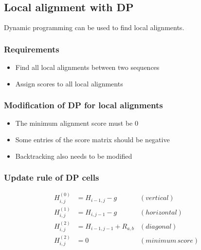 %
%

%
%
\subsection{Local alignment with DP}
Dynamic programming can be used to find local alignments.

%
%
\subsubsection*{Requirements}
\begin{itemize}
\item Find all local alignments between two sequences
\item Assign scores to all local alignments
\end{itemize}

%
%
\subsubsection*{Modification of DP for local alignments}
\begin{itemize}
\item The minimum alignment score must be 0
\item Some entries of the score matrix should be negative
\item Backtracking also needs to be modified
\end{itemize}

%
%
\subsubsection*{Update rule of DP cells}
\begin{align*}
H_{i,j}^{(0)} &= H_{i-1,j} - g &(vertical) \\
H_{i,j}^{(1)} &= H_{i,j-1} - g	&(horizontal) \\
H_{i,j}^{(2)} &= H_{i-1,j-1} + R_{a,b} &(diagonal) \\
H_{i,j}^{(2)} &= 0 &(minimum \, score)
\end{align*}

%
%
